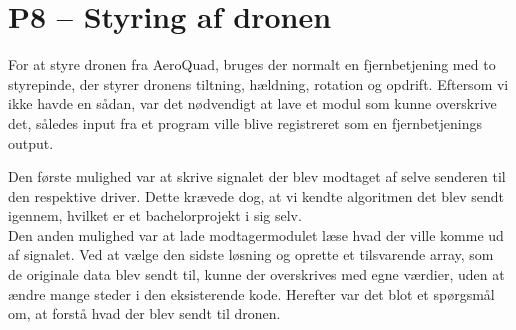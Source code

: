 \documentclass[Main]{subfiles}
\begin{document}
\section[Styring af dronen]{P8 -- Styring af dronen}
For at styre dronen fra AeroQuad, bruges der normalt en fjernbetjening med to styrepinde, der styrer dronens tiltning, hældning, rotation og opdrift.
Eftersom vi ikke havde en sådan, var det nødvendigt at lave et modul som kunne overskrive det, således input fra et program ville blive registreret som en fjernbetjenings output.


Den første mulighed var at skrive signalet der blev modtaget af selve senderen til den respektive driver. 
Dette krævede dog, at vi kendte algoritmen det blev sendt igennem, hvilket er et bachelorprojekt i sig selv.
\\
Den anden mulighed var at lade modtagermodulet læse hvad der ville komme ud af signalet.
Ved at vælge den sidste løsning og oprette et tilsvarende array, som de originale data blev sendt til, kunne der overskrives med egne værdier, uden at ændre mange steder i den eksisterende kode.
Herefter var det blot et spørgsmål om, at forstå hvad der blev sendt til dronen.
\end{document}
